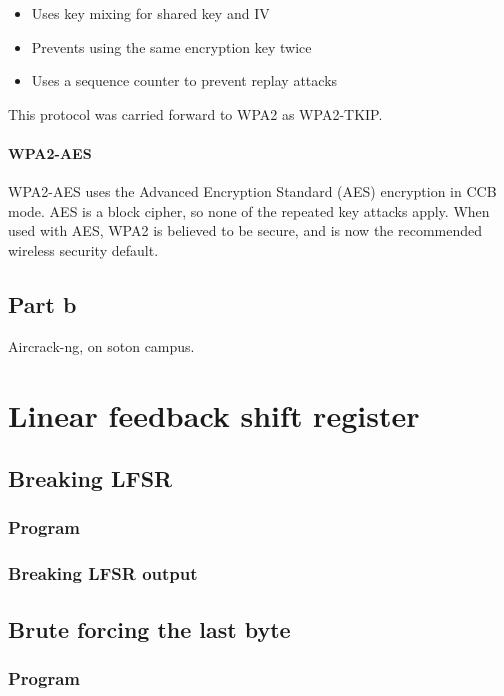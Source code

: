 \documentclass[pdftex, 12pt, a4paper]{article}
\begin{document}
\begin{itemize}
\item Uses key mixing for shared key and IV
\item Prevents using the same encryption key twice
\item Uses a sequence counter to prevent replay attacks
\end{itemize}

This protocol was carried forward to WPA2 as WPA2-TKIP.

\paragraph{WPA2-AES}
WPA2-AES uses the Advanced Encryption Standard (AES) encryption in CCB mode.
AES is a block cipher, so none of the repeated key attacks apply.  When used with AES, WPA2 is believed to be secure, and is now the recommended wireless security default.

\subsection{Part b}
Aircrack-ng, on soton campus.

\pagebreak
\printbibliography

\pagebreak
\appendices
\section{Linear feedback shift register}
\subsection{Breaking LFSR}
\subsubsection{Program}\label{break-lfsr}

\pagebreak

\subsubsection{Breaking LFSR output}\label{break-lfsr-out}
\pagebreak

\subsection{Brute forcing the last byte}
\subsubsection{Program}\label{last-byte}

\pagebreak
\end{document}
